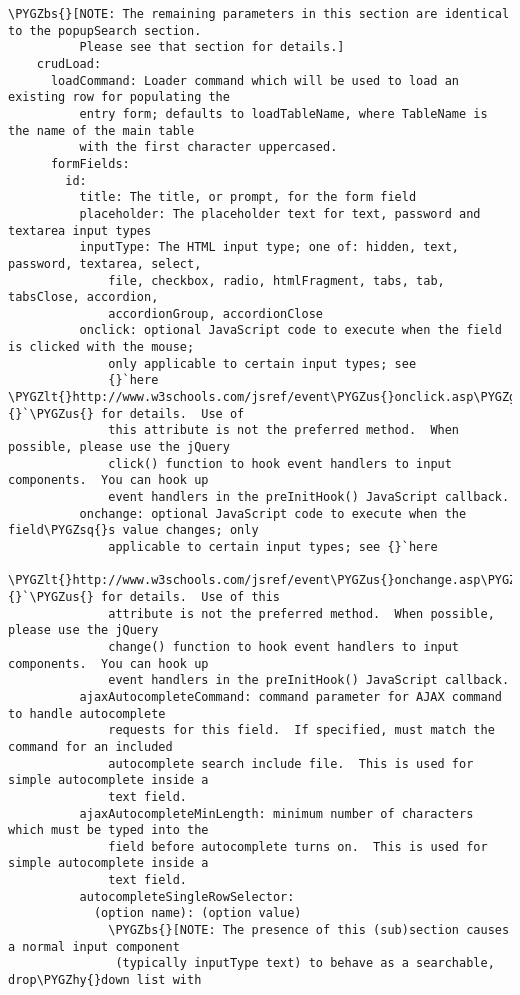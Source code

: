 \documentclass[letterpaper,10pt,english]{sphinxmanual}
\def\PYGZbs{\char`\\}
\def\PYGZus{\char`\_}
\def\PYGZlt{\char`\<}
\def\PYGZgt{\char`\>}
\def\PYGZhy{\char`\-}
\def\PYGZsq{\char`\'}
\renewcommand\PYGZsq{\textquotesingle}
\begin{document}
\begin{Verbatim}[commandchars=\\\{\}]
      \PYGZbs{}[NOTE: The remaining parameters in this section are identical to the popupSearch section.
          Please see that section for details.]
    crudLoad:
      loadCommand: Loader command which will be used to load an existing row for populating the
          entry form; defaults to loadTableName, where TableName is the name of the main table
          with the first character uppercased.
      formFields:
        id:
          title: The title, or prompt, for the form field
          placeholder: The placeholder text for text, password and textarea input types
          inputType: The HTML input type; one of: hidden, text, password, textarea, select,
              file, checkbox, radio, htmlFragment, tabs, tab, tabsClose, accordion,
              accordionGroup, accordionClose
          onclick: optional JavaScript code to execute when the field is clicked with the mouse;
              only applicable to certain input types; see
              {}`here \PYGZlt{}http://www.w3schools.com/jsref/event\PYGZus{}onclick.asp\PYGZgt{}{}`\PYGZus{} for details.  Use of
              this attribute is not the preferred method.  When possible, please use the jQuery
              click() function to hook event handlers to input components.  You can hook up
              event handlers in the preInitHook() JavaScript callback.
          onchange: optional JavaScript code to execute when the field\PYGZsq{}s value changes; only
              applicable to certain input types; see {}`here
              \PYGZlt{}http://www.w3schools.com/jsref/event\PYGZus{}onchange.asp\PYGZgt{}{}`\PYGZus{} for details.  Use of this
              attribute is not the preferred method.  When possible, please use the jQuery
              change() function to hook event handlers to input components.  You can hook up
              event handlers in the preInitHook() JavaScript callback.
          ajaxAutocompleteCommand: command parameter for AJAX command to handle autocomplete
              requests for this field.  If specified, must match the command for an included
              autocomplete search include file.  This is used for simple autocomplete inside a
              text field.
          ajaxAutocompleteMinLength: minimum number of characters which must be typed into the
              field before autocomplete turns on.  This is used for simple autocomplete inside a
              text field.
          autocompleteSingleRowSelector:
            (option name): (option value)
              \PYGZbs{}[NOTE: The presence of this (sub)section causes a normal input component
               (typically inputType text) to behave as a searchable, drop\PYGZhy{}down list with

\end{Verbatim}
\end{document}
